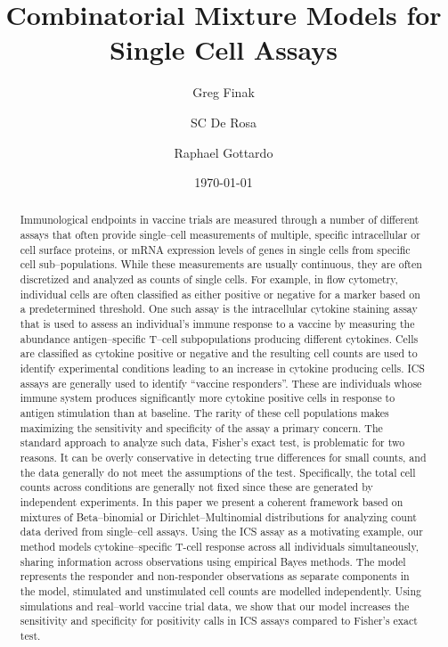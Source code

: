 \documentclass[11pt]{article}
\title{Combinatorial Mixture Models for Single Cell Assays}
\author[1]{Greg Finak}
\author[2]{SC De Rosa}
\author[1]{Raphael Gottardo}
\affil[1]{Vaccine and Infectious Disease Division, Fred Hutchinson Cancer Research Center (FHCRC), Seattle, WA}
\affil[2]{HIV Vaccine Trials Network, Fred Hutchinson Cancer Research Center (FHCRC), Seattle, Wa}
\date{\today}
\begin{document}
\maketitle
\begin{abstract}
Immunological endpoints in vaccine trials are measured through a number of different assays that often provide single--cell measurements of multiple, specific intracellular or cell surface proteins, or mRNA expression levels of genes in single cells from specific cell sub--populations. While these measurements are usually continuous, they are often discretized and analyzed as counts of single cells. For example, in flow cytometry, individual cells are often classified as either positive or negative for a marker based on a predetermined threshold.  One such assay is the intracellular cytokine staining assay that is used to assess an individual's immune response to a vaccine by measuring the abundance antigen--specific T--cell subpopulations producing different cytokines. Cells are classified as cytokine positive or negative and the resulting cell counts are used to identify experimental conditions leading to an increase in cytokine producing cells. ICS assays are generally used to identify ``vaccine responders''. These are individuals whose immune system produces significantly more cytokine positive cells in response to antigen stimulation than at baseline. The rarity of these cell populations makes maximizing the sensitivity and specificity of the assay a primary concern. The standard approach to analyze such data, Fisher's exact test, is problematic for two reasons. It can be overly conservative in detecting true differences for small counts, and the data generally do not meet the assumptions of the test. Specifically, the total cell counts across conditions are generally not fixed since these are generated by independent experiments.  In this paper we present a coherent framework based on mixtures of Beta--binomial or Dirichlet--Multinomial distributions for analyzing count data derived from single--cell assays.  Using the ICS assay as a motivating example, our method models cytokine–specific T-cell response across all individuals simultaneously, sharing information across observations using empirical Bayes methods. The model represents the responder and non-responder observations as separate components in the model, stimulated and unstimulated cell counts are modelled independently. Using simulations and real--world vaccine trial data, we show that our model increases the sensitivity and specificity for positivity calls in ICS assays compared to Fisher's exact test. 
\end{abstract}
\end{document}

